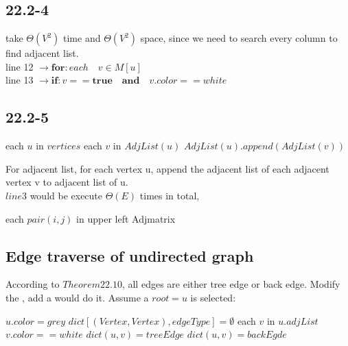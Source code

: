 \documentclass[]{article}
\begin{document}
\subsection{22.2-4}
take $\Theta (V^2)$ time and $\Theta (V^2)$ space, since we need to search every column to find adjacent list.\\
line 12 $\rightarrow \textbf{for}: each \quad v \in M[u]$\\
line 13 $\rightarrow \textbf {if}: v == \textbf{true} \quad \textbf{and} \quad v.color == white $

\subsection{22.2-5}

\begin{codebox}
	
	\li \For each $u$ in $vertices$
	\li		\Do \For each $v$ in $AdjList(u)$
	\li 		\Do $AdjList(u).append(AdjList(v))$
	\End
	\End
\end{codebox}

For adjacent list, for each vertex u, append the adjacent list of each adjacent vertex v to adjacent list of u.\\
$line 3$ would be execute $\Theta(E)$ times in total, 

\begin{codebox}
	\li \For each $pair(i,j)$ in upper left Adjmatrix
	\li		\Do {}
	\End
\end{codebox}

\subsection{Edge traverse of undirected graph}

According to $Theorem 22.10$, all edges are either tree edge or back edge. Modify the , add a  would do it. Assume a $root = u$ is selected:

\begin{codebox}
	
	\li $u.color = grey$
	\li $dict[(Vertex,Vertex), edgeType] = \emptyset$
	\li	\For each $v$ in $u.adjList$
	\li \Do \If $v.color == white$
	\li 	\Then $dict(u,v) = treeEdge$
	\li 		  {}
	\li 	\Else $dict(u,v) = backEgde$
	\End
	\End
	\li {}
	
\end{codebox}
\end{document}
